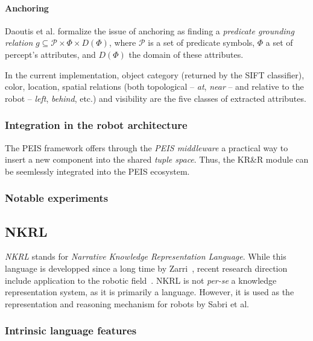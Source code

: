 \documentclass[a4paper]{article}
\begin{document}
\paragraph{Anchoring} Daoutis et al. formalize the issue of anchoring as
finding a \emph{predicate grounding relation} $g \subseteq \mathcal{P} \times
\Phi \times D(\Phi)$, where $\mathcal{P}$ is a set of predicate symbols, $\Phi$
a set of percept's attributes, and $D(\Phi)$ the domain of these attributes.

In the current implementation, object category (returned by the SIFT
classifier), color, location, spatial relations (both topological -- \emph{at},
\emph{near} -- and relative to the robot -- \emph{left}, \emph{behind}, etc.)
and visibility are the five classes of extracted attributes.

\subsubsection{Integration in the robot architecture}
\label{sect|peis-integration}

The PEIS framework offers through the \emph{PEIS middleware} a practical way to
insert a new component into the shared \emph{tuple space}.  Thus, the KR\&R
module can be seemlessly integrated into the PEIS ecosystem.

\subsubsection{Notable experiments}
\label{sect|peis-expe}

\subsection{NKRL}
\label{sect|nkrl}

\emph{NKRL} stands for \emph{Narrative Knowledge Representation Language}.
While this language is developped since a long time by Zarri~\cite{Zarri1997,
Zarri2008}, recent research direction include application to the robotic
field~\cite{Sabri2011}. NKRL is not {\it per-se} a knowledge representation
system, as it is primarily a language. However, it is used as the
representation and reasoning mechanism for robots by Sabri et al.

\subsubsection{Intrinsic language features}
\label{sect|nkrl-intrinsic-features}
\end{document}
